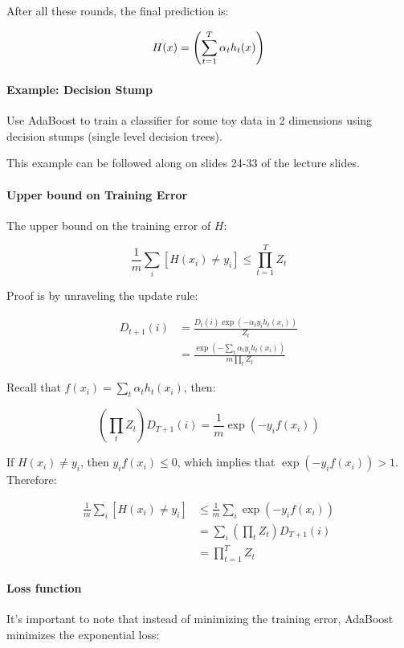 \documentclass{idc_msc}
\let\sign\relax
\DeclareMathOperator*{\sign}{sign}
\begin{document}
After all these rounds, the final prediction is:

\[H(x) = \sign\left(\sum_{t=1}^T \alpha_t h_t(x) \right) \]

\paragraph{Example: Decision Stump}

Use AdaBoost to train a classifier for some toy data in 2 dimensions using decision stumps (single level decision trees).

This example can be followed along on slides 24-33 of the lecture slides.

\paragraph{Upper bound on Training Error}

The upper bound on the training error of \(H\):

\[\frac{1}{m} \sum_i [H(x_i) \ne y_i] \le \prod_{t=1}^T Z_t\]

Proof is by unraveling the update rule:

\[
\begin{aligned}
D_{t+1}(i)
&= \frac{D_t(i) \exp(-\alpha_t y_i h_t(x_i))}{Z_t} \\
&= \frac{\exp(-\sum_t \alpha_t y_i h_t(x_i))}{m \prod_t Z_t}
\end{aligned}
\]

Recall that \(f(x_i) = \sum_t \alpha_t h_t(x_i)\), then:

\[\left(\prod_t Z_t\right) D_{T+1}(i) = \frac{1}{m}\exp(-y_i f(x_i))\]

If \(H(x_i) \ne y_i\), then \(y_i f(x_i) \le 0\), which implies that \(\exp(-y_i f(x_i)) > 1\).
Therefore:

\[
\begin{aligned}
\frac{1}{m} \sum_i [H(x_i) \ne y_i]
&\le \frac{1}{m}\sum_i \exp(-y_i f(x_i)) \\
&= \sum_i \left(\prod_t Z_t\right) D_{T+1}(i) \\
&= \prod_{t=1}^T Z_t
\end{aligned}
\]

\paragraph{Loss function}

It's important to note that instead of minimizing the training error, AdaBoost minimizes the exponential loss:
\end{document}
